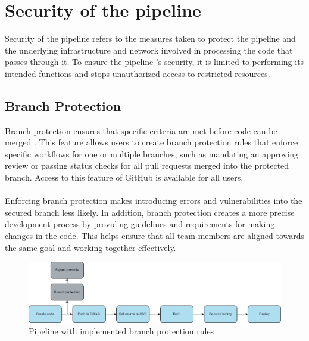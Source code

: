 \section{Security of the pipeline}
\label{Security of the pipeline}
Security of the \gls{pipeline} refers to the measures taken to protect the \gls{pipeline} and the underlying infrastructure and network involved in processing the code that passes through it. To ensure the \gls{pipeline} 's security, it is limited to performing its intended functions and stops unauthorized access to restricted resources.

\subsection{Branch Protection}
Branch protection ensures that specific criteria are met before code can be merged \cite{branch}. This feature allows users to create branch protection rules that enforce specific workflows for one or multiple branches, such as mandating an approving review or passing status checks for all pull requests merged into the protected branch. Access to this feature of GitHub is available for all users.
\\~\\
Enforcing branch protection makes introducing errors and vulnerabilities into the secured branch less likely. In addition, branch protection creates a more precise development process by providing guidelines and requirements for making changes in the code. This helps ensure that all team members are aligned towards the same goal and working together effectively.  


\vspace{2mm}
\begin{figure}[H]
    \centering
    \includegraphics[width=0.8\columnwidth]{Images/pipeline6.png}
    \caption{Pipeline with implemented branch protection rules}
    \label{fig: Pipeline with implemented branch protection rules}
\end{figure}

